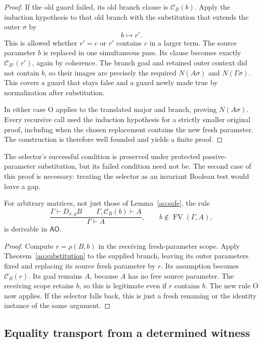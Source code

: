 \begin{proof}
If the old guard failed, its old branch clause is $\mathcal C_B(b)$.
Apply the induction hypothesis to that old branch with the substitution
that extends the outer $\sigma$ by
\[
                         b\longmapsto r'.
\]
This is allowed whether $r'=c$ or $r'$ contains $c$ in a larger term.
The source parameter $b$ is replaced in one simultaneous pass.  Its
clause becomes exactly $\mathcal C_{B'}(r')$, again by coherence.
The branch goal and retained outer context did not contain $b$, so
their images are precisely the required $N(A\sigma)$ and
$N(\Gamma\sigma)$.  This covers a guard that stays false and a guard
newly made true by normalization after substitution.

In either case O applies to the translated major and branch, proving
$N(A\sigma)$.  Every recursive call used the induction hypothesis for
a strictly smaller original proof, including when the chosen replacement
contains the new fresh parameter.  The construction is therefore well
founded and yields a finite proof.
\end{proof}

The selector's successful condition is preserved under protected passive-
parameter substitution, but its failed condition need not be.  The second
case of this proof is necessary: treating the selector as an invariant
Boolean test would leave a gap.

\begin{corollary}
\label{ao:ordinary-open}
For arbitrary matrices, not just those of Lemma~\ref{ao:safe}, the rule
\[
 \frac{\Gamma\vdash D_{x,y}B\qquad
       \Gamma,\mathcal C_B(b)\vdash A}
      {\Gamma\vdash A},
 \qquad b\notin\operatorname{FV}(\Gamma,A),
\]
is derivable in $\mathsf{AO}$.
\end{corollary}
\begin{proof}
Compute $r=\rho(B,b)$ in the receiving fresh-parameter scope.  Apply
Theorem~\ref{ao:substitution} to the supplied branch, leaving its outer
parameters fixed and replacing its source fresh parameter by $r$.
Its assumption becomes $\mathcal C_B(r)$.  Its goal remains $A$,
because $A$ has no free source parameter.  The receiving scope retains
$b$, so this is legitimate even if $r$ contains $b$.  The new rule O
now applies.  If the selector falls back, this is just a fresh renaming
or the identity instance of the same argument.
\end{proof}

\subsection{Equality transport from a determined witness}

